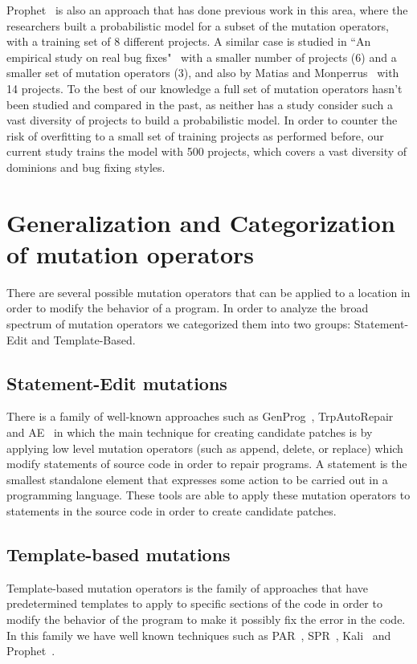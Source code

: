 \documentclass[conference]{IEEEtran}
\begin{document}
Prophet~\cite{long15} is also an approach that has done previous work in this 
area, where the researchers built a 
probabilistic model for a subset of the mutation operators, with a training set 
of 8 different projects. A similar case is studied in ``An empirical study on 
real bug fixes"~\cite{zhong15} with a smaller number of projects (6) and a 
smaller set of 
mutation operators (3), and also by Matias and Monperrus~\cite{matias15} with 14 
projects. To the best of our knowledge a full set of mutation 
operators hasn't been studied and compared in the past, as neither has a study 
consider such a vast diversity of projects to build a probabilistic model. In 
order to counter the 
risk of overfitting to a small set of training projects as performed before, our 
current study trains the model with 500 projects, which covers a vast diversity 
of dominions and bug fixing styles.

\section{Generalization and Categorization of mutation operators}

There are several possible mutation operators that can be applied to a location 
in order to modify the behavior of a program. In order to analyze the broad spectrum of mutation operators we categorized them into two groups: Statement-Edit and Template-Based. 

\subsection{Statement-Edit mutations}
There is a family of well-known approaches such as GenProg~\cite{legoues12}, 
TrpAutoRepair\cite{Qi13} and AE~\cite{Weimer13} in which the main technique for creating candidate 
patches is by applying low level mutation operators (such as append, delete, or 
replace) which modify statements of source code in order to 
repair programs. A statement is the smallest standalone element that expresses 
some action to be carried out in a programming language. These tools are able to 
apply these mutation operators to statements in the source code in order to create candidate patches.

\subsection{Template-based mutations}
Template-based mutation operators is the family of approaches that have predetermined templates to apply to specific sections of the code in order to modify the behavior of the program to make it possibly fix the error in the code. In this family we have well known techniques such as PAR~\cite{kim2013}, SPR~\cite{fan15}, Kali~\cite{Qi15} and 
Prophet~\cite{Long2016}.
\end{document}
